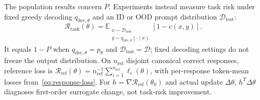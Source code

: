 The population results concern $P$. Experiments instead measure task risk
under fixed greedy decoding $q_{\mathrm{dec},\theta}$ and an ID or OOD
prompt distribution $\mathcal D_{\mathrm{test}}$:
\begin{equation}
 \mathcal R_{\mathrm{task}}(\theta)=
 \mathbb E_{\substack{x\sim\mathcal D_{\mathrm{test}}\\
 y\sim q_{\mathrm{dec},\theta}(\cdot\mid x)}}[1-c(x,y)].
 \label{eq:task-risk}
\end{equation}
It equals $1-P$ when $q_{\mathrm{dec},\theta}=p_\theta$ and
$\mathcal D_{\mathrm{test}}=\mathcal D$; fixed decoding settings do not
freeze the output distribution.
On $n_{\mathrm{ref}}$ disjoint canonical correct responses, reference loss is
$\mathcal R_{\mathrm{ref}}(\theta)=n_{\mathrm{ref}}^{-1}
\sum_{i=1}^{n_{\mathrm{ref}}}\ell_i(\theta)$, with per-response token-mean
losses from~\eqref{eq:response-loss}.
For $h=\nabla\mathcal R_{\mathrm{ref}}(\theta_0)$ and actual update
$\Delta\theta$, $h^T\Delta\theta$ diagnoses first-order surrogate change,
not task-risk improvement.
